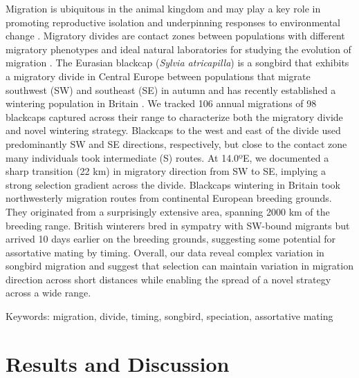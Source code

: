 \documentclass[a4paper, twoside]{templates/ociamthesis}
\begin{document}
Migration is ubiquitous in the animal kingdom and may play a key role in promoting reproductive isolation \autocite{bearhopAssortativeMatingMechanism2005,benschMorphologicalMolecularVariation1999,helbigSESWmigratingBlackcap1991,irwinSiberianMigratoryDivides2005} and underpinning responses to environmental change \autocite{bertholdRapidMicroevolutionMigratory1992,plummerSupplementaryFeedingGardens2015}.
Migratory divides are contact zones between populations with different migratory phenotypes and ideal natural laboratories for studying the evolution of migration \autocite{delmoreGeneticsSeasonalMigration2016,delmoreHybridSongbirdsEmploy2014}.
The Eurasian blackcap (\emph{Sylvia atricapilla}) is a songbird that exhibits a migratory divide in Central Europe between populations that migrate southwest (SW) and southeast (SE) in autumn \autocite{helbigInheritanceMigratoryDirection1991,helbigPopulationDifferentiationMigratory1992,helbigSESWmigratingBlackcap1991} and has recently established a wintering population in Britain \autocite{bearhopAssortativeMatingMechanism2005,bertholdMigratoryBehaviourPopulation1988,bertholdRapidMicroevolutionMigratory1992,leachWinteringBlackcapsBritain1981}. We tracked 106 annual migrations of 98 blackcaps captured across their range to characterize both the migratory divide and novel wintering strategy.
Blackcaps to the west and east of the divide used predominantly SW and SE directions, respectively, but close to the contact zone many individuals took intermediate (S) routes. At 14.0ºE, we documented a sharp transition (22 km) in migratory direction from SW to SE, implying a strong selection gradient across the divide.
Blackcaps wintering in Britain took northwesterly migration routes from continental European breeding grounds. They originated from a surprisingly extensive area, spanning 2000 km of the breeding range. British winterers bred in sympatry with SW-bound migrants but arrived 10 days earlier on the breeding grounds, suggesting some potential for assortative mating by timing.
Overall, our data reveal complex variation in songbird migration and suggest that selection can maintain variation in migration direction across short distances while enabling the spread of a novel strategy across a wide range.

Keywords: migration, divide, timing, songbird, speciation, assortative mating

\hypertarget{results-and-discussion}{%
\section{Results and Discussion}\label{results-and-discussion}}
\end{document}
